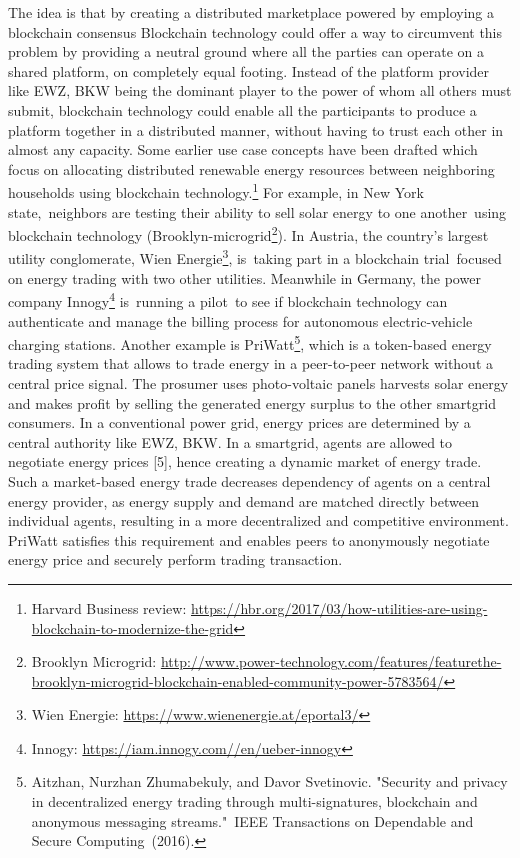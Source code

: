 \documentclass{scrartcl}
\begin{document}
    The idea is that by creating a distributed marketplace powered by employing a blockchain consensus Blockchain technology could offer a way to circumvent this problem by providing a neutral ground where all the parties can operate on a shared platform, on completely equal footing. Instead of the platform provider like EWZ, BKW being the dominant player to the power of whom all others must submit, blockchain technology could enable all the participants to produce a platform together in a distributed manner, without having to trust each other in almost any capacity. Some earlier use case concepts have been drafted which focus on allocating distributed renewable energy resources between neighboring households using blockchain technology.\footnote{Harvard Business review: \newline
    \url{https://hbr.org/2017/03/how-utilities-are-using-blockchain-to-modernize-the-grid}} For example, in New York state, neighbors are testing their ability to sell solar energy to one another using blockchain technology (Brooklyn-microgrid\footnote{Brooklyn Microgrid: \url{http://www.power-technology.com/features/featurethe-brooklyn-microgrid-blockchain-enabled-community-power-5783564/}}). In Austria, the country’s largest utility conglomerate, Wien Energie\footnote{Wien Energie: \url{https://www.wienenergie.at/eportal3/}}, is taking part in a blockchain trial focused on energy trading with two other utilities. Meanwhile in Germany, the power company Innogy\footnote{Innogy: \url{https://iam.innogy.com//en/ueber-innogy}} is running a pilot to see if blockchain technology can authenticate and manage the billing process for autonomous electric-vehicle charging stations. Another example is PriWatt\footnote{Aitzhan, Nurzhan Zhumabekuly, and Davor Svetinovic. "Security and privacy in decentralized energy trading through multi-signatures, blockchain and anonymous messaging streams." IEEE Transactions on Dependable and Secure Computing (2016).}, which is a token-based energy trading system that allows to trade energy in a peer-to-peer network without a central price signal. The prosumer uses photo-voltaic panels harvests solar energy and makes profit by selling the generated energy surplus to the other smartgrid consumers. In a conventional power grid, energy prices are determined by a central authority like EWZ, BKW. In a smartgrid, agents are allowed to negotiate energy prices [5], hence creating a dynamic market of energy trade. Such a market-based energy trade decreases dependency of agents on a central energy provider, as energy supply and demand are matched directly between individual agents, resulting in a more decentralized and competitive environment. PriWatt satisfies this requirement and enables peers to anonymously negotiate energy price and securely perform trading transaction.
    
\end{document}

